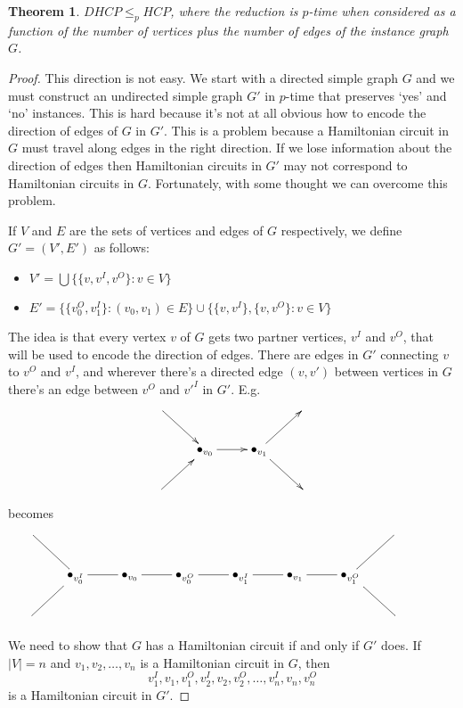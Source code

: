 \documentclass{article}
\theoremstyle{plain}
\newtheorem{theorem}{Theorem}[section]{\bfseries}{\itshape}
\theoremstyle{definition}
\begin{document}
\begin{theorem}
$DHCP\leq_p HCP$, where the reduction is $p$-time when considered as a function of the number of vertices plus the number of edges of the instance graph $G$.
\end{theorem}
\begin{proof}
This direction is not easy. We start with a directed simple graph $G$ and we must construct an undirected  simple graph $G'$ in $p$-time that preserves `yes' and `no' instances. This is hard because it's not at all obvious how to encode the direction of edges of $G$ in $G'$. This is a problem because a Hamiltonian circuit in $G$ must travel along edges in the right direction. If we lose information about the direction of edges then Hamiltonian circuits in $G'$ may not correspond to Hamiltonian circuits in $G$. Fortunately, with some thought we can overcome this problem.

If $V$ and $E$ are the sets of vertices and edges of $G$ respectively, we define $G'=(V',E')$ as follows:
\begin{itemize}
\item $V'=\bigcup\{\{v,v^I,v^O\}:v\in V\}$
\item $E'=\{\{v_0^O,v_1^I\} : (v_0,v_1)\in E\} \cup \{\{v,v^I\},\{v,v^O\}:v\in V\}$
\end{itemize}

The idea is that every vertex $v$ of $G$ gets two partner vertices, $v^I$ and $v^O$, that will be used to encode the direction of edges. There are edges in $G'$ connecting $v$ to $v^O$ and $v^I$, and wherever there's a directed edge $(v,v')$ between vertices in $G$ there's an edge between $v^O$ and $v'^I$ in $G'$. E.g.
\[\xymatrix{
\ar[dr]& & &\\
& \bullet_{v_0}\ar[r] &\bullet_{v_1}\ar[ur]\ar[dr] & \\
\ar[ur] & & &}\]
becomes 
\[\xymatrix{
\ar@{-}[dr] & & & & & & & &\\
& \bullet_{v_0^I}\ar@{-}[r] & \bullet_{v_0}\ar@{-}[r] & \bullet_{v_0^O}\ar@{-}[r] & \bullet_{v_1^I}\ar@{-}[r] & \bullet_{v_1}\ar@{-}[r] & \bullet_{v_1^O}\ar@{-}[ur]\ar@{-}[dr]\\
\ar@{-}[ur] & & & & & & & &}\]

We need to show that $G$ has a Hamiltonian circuit if and only if $G'$ does. If $|V|=n$ and $v_1,v_2,\ldots,v_n$ is a Hamiltonian circuit in $G$, then 
\begin{equation*}v^I_1,v_1, v^O_1, v_2^I, v_2, v_2^O,\ldots,v_n^I,v_n,v_n^O\end{equation*} is a Hamiltonian circuit in $G'$. 


\end{proof}
\end{document}
